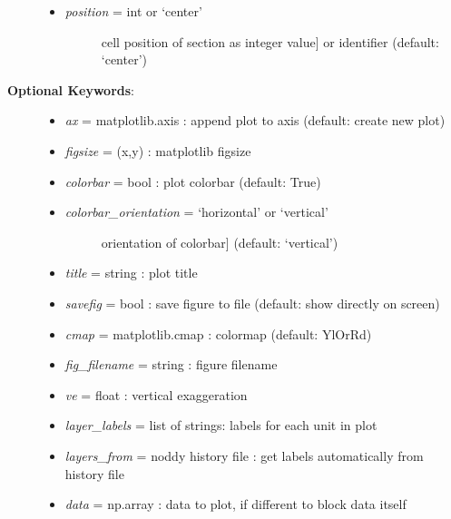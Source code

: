 \documentclass[a4paper,10pt,english]{sphinxmanual}
\begin{document}
\begin{fulllineitems}
\begin{fulllineitems}
\begin{description}
\begin{itemize}
\item {} \begin{description}
\item[{\emph{position} = int or `center'}] \leavevmode{[}cell position of section as integer value{]}
or identifier (default: `center')

\end{description}

\end{itemize}

\item[{\textbf{Optional Keywords}:}] \leavevmode\begin{itemize}
\item {} 
\emph{ax} = matplotlib.axis : append plot to axis (default: create new plot)

\item {} 
\emph{figsize} = (x,y) : matplotlib figsize

\item {} 
\emph{colorbar} = bool : plot colorbar (default: True)

\item {} \begin{description}
\item[{\emph{colorbar\_orientation} = `horizontal' or `vertical'}] \leavevmode{[}orientation of colorbar{]}
(default: `vertical')

\end{description}

\item {} 
\emph{title} = string : plot title

\item {} 
\emph{savefig} = bool : save figure to file (default: show directly on screen)

\item {} 
\emph{cmap} = matplotlib.cmap : colormap (default: YlOrRd)

\item {} 
\emph{fig\_filename} = string : figure filename

\item {} 
\emph{ve} = float : vertical exaggeration

\item {} 
\emph{layer\_labels} = list of strings: labels for each unit in plot

\item {} 
\emph{layers\_from} = noddy history file : get labels automatically from history file

\item {} 
\emph{data} = np.array : data to plot, if different to block data itself


\end{itemize}
\end{description}
\end{fulllineitems}
\end{fulllineitems}
\end{document}
